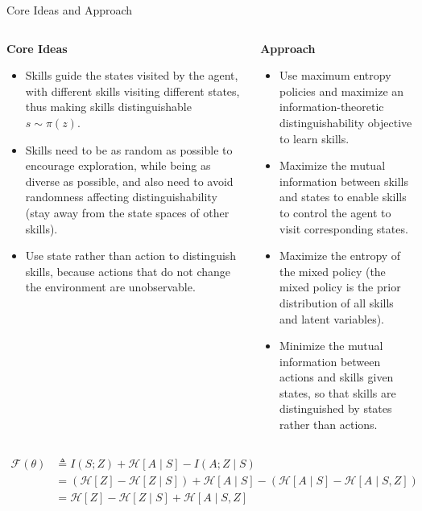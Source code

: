 \documentclass{beamer}
\begin{document}
\begin{frame}{Core Ideas and Approach}
	\tiny
    \begin{columns}
        \begin{column}{0.5\textwidth}
            \textbf{Core Ideas}
            \begin{itemize}
                \item Skills guide the states visited by the agent, with different skills visiting different states, thus making skills distinguishable \(s \sim \pi(z)\).
                \vspace{0.2cm}
                \item Skills need to be as random as possible to encourage exploration, while being as diverse as possible, and also need to avoid randomness affecting distinguishability (stay away from the state spaces of other skills).
                \vspace{0.2cm}
                \item Use state rather than action to distinguish skills, because actions that do not change the environment are unobservable.
            \end{itemize}
        \end{column}
        \begin{column}{0.5\textwidth}
            \textbf{Approach}
            \begin{itemize}
                \item Use maximum entropy policies and maximize an information-theoretic distinguishability objective to learn skills.

                    \item Maximize the mutual information between skills and states to enable skills to control the agent to visit corresponding states.
                    \item Maximize the entropy of the mixed policy (the mixed policy is the prior distribution of all skills and latent variables).
                    \item Minimize the mutual information between actions and skills given states, so that skills are distinguished by states rather than actions.
            \end{itemize}
        \end{column}
    \end{columns}
    
    \vspace{1cm}
    
    \[
\begin{aligned}
\mathcal{F}(\theta) &\triangleq I(S; Z) + \mathcal{H}[A \mid S] - I(A; Z \mid S) \\
&= (\mathcal{H}[Z] - \mathcal{H}[Z \mid S]) + \mathcal{H}[A \mid S] - (\mathcal{H}[A \mid S] - \mathcal{H}[A \mid S, Z]) \\
&= \mathcal{H}[Z] - \mathcal{H}[Z \mid S] + \mathcal{H}[A \mid S, Z]
\end{aligned}
\]
\end{frame}
\end{document}
